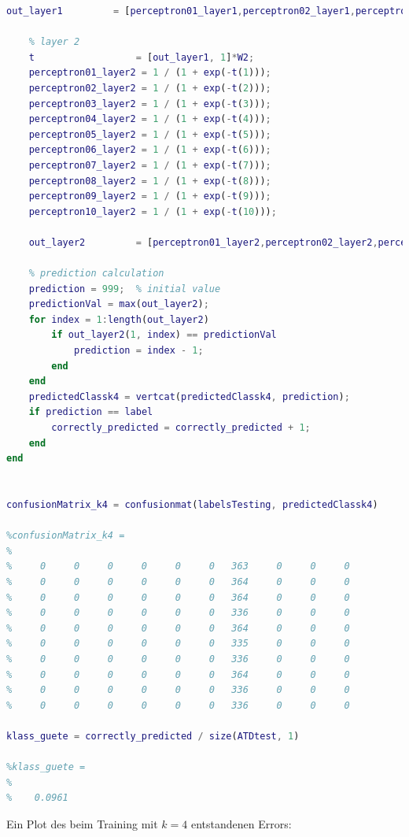 \documentclass[12pt]{article}
\begin{document}
\begin{lstlisting}[language=Matlab]
    out_layer1         = [perceptron01_layer1,perceptron02_layer1,perceptron03_layer1,perceptron04_layer1];
    
    % layer 2
    t                  = [out_layer1, 1]*W2;
    perceptron01_layer2 = 1 / (1 + exp(-t(1)));
    perceptron02_layer2 = 1 / (1 + exp(-t(2)));
    perceptron03_layer2 = 1 / (1 + exp(-t(3)));
    perceptron04_layer2 = 1 / (1 + exp(-t(4)));
    perceptron05_layer2 = 1 / (1 + exp(-t(5)));
    perceptron06_layer2 = 1 / (1 + exp(-t(6)));
    perceptron07_layer2 = 1 / (1 + exp(-t(7)));
    perceptron08_layer2 = 1 / (1 + exp(-t(8)));
    perceptron09_layer2 = 1 / (1 + exp(-t(9)));
    perceptron10_layer2 = 1 / (1 + exp(-t(10)));
    
    out_layer2         = [perceptron01_layer2,perceptron02_layer2,perceptron03_layer2,perceptron04_layer2,perceptron05_layer2,perceptron06_layer2,perceptron07_layer2,perceptron08_layer2,perceptron09_layer2,perceptron10_layer2];
    
    % prediction calculation
    prediction = 999;  % initial value
    predictionVal = max(out_layer2);
    for index = 1:length(out_layer2)
        if out_layer2(1, index) == predictionVal
            prediction = index - 1;
        end
    end
    predictedClassk4 = vertcat(predictedClassk4, prediction);
    if prediction == label
        correctly_predicted = correctly_predicted + 1;
    end
end


confusionMatrix_k4 = confusionmat(labelsTesting, predictedClassk4)

%confusionMatrix_k4 =
%
%     0     0     0     0     0     0   363     0     0     0
%     0     0     0     0     0     0   364     0     0     0
%     0     0     0     0     0     0   364     0     0     0
%     0     0     0     0     0     0   336     0     0     0
%     0     0     0     0     0     0   364     0     0     0
%     0     0     0     0     0     0   335     0     0     0
%     0     0     0     0     0     0   336     0     0     0
%     0     0     0     0     0     0   364     0     0     0
%     0     0     0     0     0     0   336     0     0     0
%     0     0     0     0     0     0   336     0     0     0

klass_guete = correctly_predicted / size(ATDtest, 1)

%klass_guete =
%
%    0.0961
\end{lstlisting}
Ein Plot des beim Training mit $k = 4$ entstandenen Errors:\\
\end{document}
